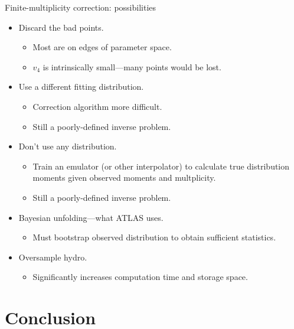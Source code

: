 \documentclass{beamer}
\begin{document}
\begin{frame}{Finite-multiplicity correction:  possibilities}
  \begin{itemize}
    \item Discard the bad points.
      \begin{itemize}
        \item Most are on edges of parameter space.
        \item $v_4$ is intrinsically small---many points would be lost.
      \end{itemize}
    \item Use a different fitting distribution.
      \begin{itemize}
        \item Correction algorithm more difficult.
        \item Still a poorly-defined inverse problem.
      \end{itemize}
    \item Don't use any distribution.
      \begin{itemize}
        \item Train an emulator (or other interpolator) to calculate true distribution moments given observed
          moments and multplicity.
        \item Still a poorly-defined inverse problem.
      \end{itemize}
    \item Bayesian unfolding---what ATLAS uses.
      \begin{itemize}
        \item Must bootstrap observed distribution to obtain sufficient statistics.
      \end{itemize}
    \item Oversample hydro.
      \begin{itemize}
        \item Significantly increases computation time and storage space.
      \end{itemize}
  \end{itemize}
\end{frame}



\section{Conclusion}
\end{document}
